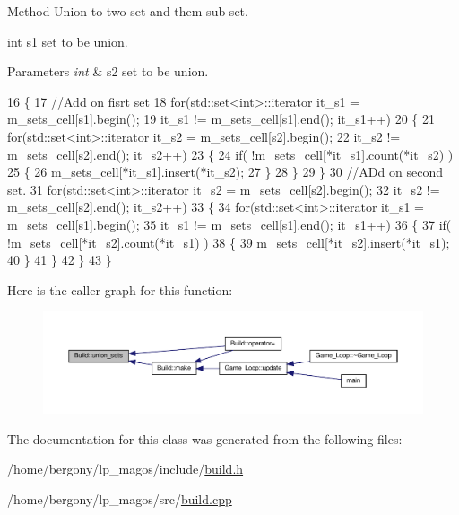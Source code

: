 Method Union to two set and them sub-\/set. 

int s1 set to be union. 
\begin{DoxyParams}{Parameters}
{\em int} & s2 set to be union. \\
\hline
\end{DoxyParams}

\begin{DoxyCode}
16 \{
17     \textcolor{comment}{//Add on fisrt set}
18     \textcolor{keywordflow}{for}(std::set<int>::iterator it\_s1 = m\_sets\_cell[s1].begin(); 
19             it\_s1 != m\_sets\_cell[s1].end(); it\_s1++)
20     \{
21         \textcolor{keywordflow}{for}(std::set<int>::iterator it\_s2 = m\_sets\_cell[s2].begin(); 
22                 it\_s2 != m\_sets\_cell[s2].end(); it\_s2++)
23         \{
24             \textcolor{keywordflow}{if}( !m\_sets\_cell[*it\_s1].count(*it\_s2) )
25             \{
26                 m\_sets\_cell[*it\_s1].insert(*it\_s2);
27             \}
28         \}
29     \}
30     \textcolor{comment}{//ADd on second set.}
31     \textcolor{keywordflow}{for}(std::set<int>::iterator it\_s2 = m\_sets\_cell[s2].begin(); 
32             it\_s2 != m\_sets\_cell[s2].end(); it\_s2++)
33     \{
34         \textcolor{keywordflow}{for}(std::set<int>::iterator it\_s1 = m\_sets\_cell[s1].begin(); 
35                 it\_s1 != m\_sets\_cell[s1].end(); it\_s1++)
36         \{
37             \textcolor{keywordflow}{if}( !m\_sets\_cell[*it\_s2].count(*it\_s1) )
38             \{
39                 m\_sets\_cell[*it\_s2].insert(*it\_s1);
40             \}
41         \}
42     \}
43 \}
\end{DoxyCode}
Here is the caller graph for this function\+:\nopagebreak
\begin{figure}[H]
\begin{center}
\leavevmode
\includegraphics[width=350pt]{classBuild_af1582ef11fb92698ba75581f2f7ead02_icgraph}
\end{center}
\end{figure}


The documentation for this class was generated from the following files\+:\begin{DoxyCompactItemize}
\item 
/home/bergony/lp\+\_\+magos/include/\hyperlink{build_8h}{build.\+h}\item 
/home/bergony/lp\+\_\+magos/src/\hyperlink{build_8cpp}{build.\+cpp}\end{DoxyCompactItemize}
